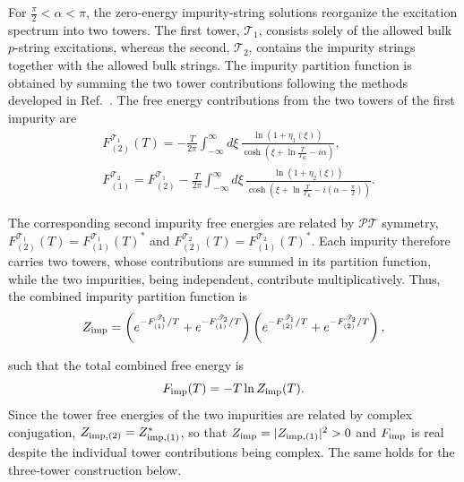 \documentclass[aps,  prb,twocolumn,
  superscriptaddress,  floatfix,  10pt         
]{revtex4-2}
\begin{document}
For $\frac{\pi}{2}<\alpha<\pi$, the zero-energy impurity-string solutions reorganize the excitation spectrum into two towers. The first tower, $\mathscr T_1$, consists solely of the allowed bulk $p$-string excitations, whereas the second, $\mathscr T_2$, contains the impurity strings together with the allowed bulk strings.
The impurity partition function is obtained by summing the two tower contributions following the methods developed in Ref.~\cite{zhakenov2025thermodynamics,kattel2026thermodynamics,kattel2026multichannel}. The free energy contributions from the two towers of the first impurity are
\begin{align}
&F_{(2)}^{\mathscr{T}_1}(T) = -\frac{T}{2\pi} \int_{-\infty}^{\infty}
d\xi\, \frac{ \ln\left(1+\eta_1(\xi)\right)
}{\cosh\left(\xi+\ln\frac{T}{T_K}-i\alpha\right)},\\
&F_{(1)}^{\mathscr{T}_2}=F_{(2)}^{\mathscr{T}_1}-\frac{T}{2\pi}\int_{-\infty}^{\infty}
d\xi\,\frac{\ln\left(1+\eta_2(\xi)\right)}{\cosh\left(
\xi+\ln\frac{T}{T_K}-i\left(\alpha-\frac{\pi}{2}\right)\right)
}.
\end{align}

The corresponding second impurity free energies are related by
$\mathscr{PT}$ symmetry, $F_{(2)}^{\mathscr{T}_1}(T)=F_{(1)}^{\mathscr{T}_1}(T)^{*}$ and $F_{(2)}^{\mathscr{T}_2}(T)=F_{(1)}^{\mathscr{T}_2}(T)^{*}$. Each impurity therefore carries two towers, whose contributions are summed in its partition function, while the two impurities, being independent, contribute multiplicatively. Thus, the combined impurity partition function is
\begin{equation}
Z_{\rm imp} =\left( e^{-F_{(1)}^{\mathscr{T}_1}/T} + e^{-F_{(1)}^{\mathscr{T}_2}/T} \right)\left( e^{-F_{(2)}^{\mathscr{T}_1}/T} + e^{-F_{(2)}^{\mathscr{T}_2}/T} \right),
\end{equation}

such that the total combined free energy is
\begin{equation}
F_{\rm imp}(T) = -T\ln Z_{\rm imp}(T).
\end{equation}
Since the tower free energies of the two impurities are related by complex conjugation, $Z_{\rm imp, (2)} = Z_{\rm imp, (1)}^*$, so that $Z_{\rm imp} = |Z_{\rm imp, (1)}|^2 > 0$ and $F_{\rm imp}$ is real despite the individual tower contributions being complex. The same holds for the three-tower construction below.
\end{document}
